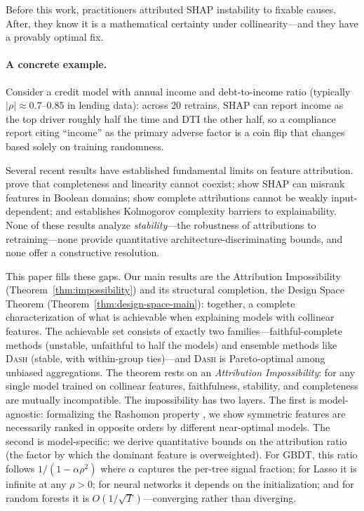 \documentclass{article}
\newcommand{\DASH}{\textsc{Dash}}
\newcommand{\GBDT}{\textsc{GBDT}}
\begin{document}
Before this work, practitioners attributed SHAP instability to fixable causes. After, they know it is a mathematical certainty under collinearity---and they have a provably optimal fix.

\paragraph{A concrete example.}
Consider a credit model with annual income and debt-to-income ratio (typically $|\rho| \approx 0.7$--$0.85$ in lending data): across 20 retrains, SHAP can report income as the top driver roughly half the time and DTI the other half, so a compliance report citing ``income'' as the primary adverse factor is a coin flip that changes based solely on training randomness.

Several recent results have established fundamental limits on feature attribution.
\citet{bilodeau2024impossibility} prove that completeness and linearity cannot coexist; \citet{huang2024failings} show SHAP can misrank features in Boolean domains; \citet{srinivas2019full} show complete attributions cannot be weakly input-dependent; and \citet{rao2025limits} establishes Kolmogorov complexity barriers to explainability.
None of these results analyze \emph{stability}---the robustness of attributions to retraining---none provide quantitative architecture-discriminating bounds, and none offer a constructive resolution.

This paper fills these gaps.
Our main results are the Attribution Impossibility (Theorem~\ref{thm:impossibility}) and its structural completion, the Design Space Theorem (Theorem~\ref{thm:design-space-main}): together, a complete characterization of what is achievable when explaining models with collinear features.
The achievable set consists of exactly two families---faithful-complete methods (unstable, unfaithful to half the models) and ensemble methods like \DASH{} (stable, with within-group ties)---and \DASH{} is Pareto-optimal among unbiased aggregations.
The theorem rests on an \emph{Attribution Impossibility}: for any single model trained on collinear features, faithfulness, stability, and completeness are mutually incompatible.
The impossibility has two layers.
The first is model-agnostic: formalizing the Rashomon property \citep{rudin2024amazing}, we show symmetric features are necessarily ranked in opposite orders by different near-optimal models.
The second is model-specific: we derive quantitative bounds on the attribution ratio (the factor by which the dominant feature is overweighted).
For \GBDT{}, this ratio follows $1/(1-\alpha\rho^2)$ where $\alpha$ captures the per-tree signal fraction; for Lasso it is infinite at any $\rho > 0$; for neural networks it depends on the initialization; and for random forests it is $O(1/\sqrt{T})$---converging rather than diverging.
\end{document}
